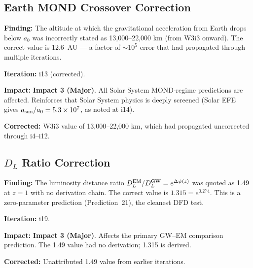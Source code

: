 \documentclass[11pt,a4paper]{article}
\newcommand{\impthree}{\textcolor{impact3}{\textbf{Impact 3 (Major)}}}
\newcommand{\ee}[1]{\times 10^{#1}}
\begin{document}
\subsection{Earth MOND Crossover Correction}
\label{sec:earth-crossover}

\begin{tcolorbox}[colback=orange!5!white, colframe=orange!70!black,
  title=\textbf{Earth MOND Crossover: 13,000 km $\to$ 12.6 AU --- Iteration 13}]

\textbf{Finding:} The altitude at which the gravitational acceleration
from Earth drops below $a_0$ was incorrectly stated as 13,000--22,000 km
(from W3i3 onward). The correct value is 12.6~AU --- a factor of
$\sim 10^5$ error that had propagated through multiple iterations.

\textbf{Iteration:} i13 (corrected).

\textbf{Impact:} \impthree. All Solar System MOND-regime predictions
are affected. Reinforces that Solar System physics is deeply screened
(Solar EFE gives $a_{\rm sun}/a_0 = 5.3\ee{7}$, as noted at i14).

\textbf{Corrected:} W3i3 value of 13,000--22,000 km, which had
propagated uncorrected through i4--i12.

\end{tcolorbox}

\subsection{$D_L$ Ratio Correction}
\label{sec:dl-ratio}

\begin{tcolorbox}[colback=orange!5!white, colframe=orange!70!black,
  title=\textbf{$D_L^{\rm EM} / D_L^{\rm GW}$ Ratio: 1.49 $\to$ 1.315 --- Iteration 19}]

\textbf{Finding:} The luminosity distance ratio
$D_L^{\rm EM} / D_L^{\rm GW} = e^{\Delta\psi(z)}$ was quoted as 1.49
at $z = 1$ with no derivation chain. The correct value is $1.315 =
e^{0.274}$. This is a zero-parameter prediction (Prediction~21), the
cleanest DFD test.

\textbf{Iteration:} i19.

\textbf{Impact:} \impthree. Affects the primary GW--EM comparison
prediction. The 1.49 value had no derivation; 1.315 is derived.

\textbf{Corrected:} Unattributed 1.49 value from earlier iterations.

\end{tcolorbox}
\end{document}
